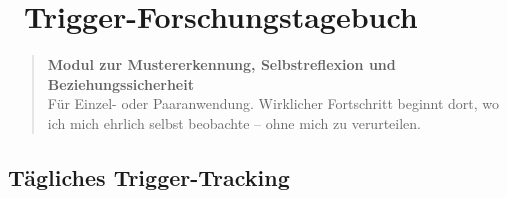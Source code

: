 
\section*{\textcolor{ctmmBlue}{\faSearch~Trigger-Forschungstagebuch}}
\label{sec:trigger-forschungstagebuch}

\begin{quote}
\textbf{\textcolor{ctmmBlue}{Modul zur Mustererkennung, Selbstreflexion und Beziehungssicherheit}}\\
Für Einzel- oder Paaranwendung. Wirklicher Fortschritt beginnt dort, wo ich mich ehrlich selbst beobachte -- ohne mich zu verurteilen.
\end{quote}

\subsection*{\textcolor{ctmmBlue}{Tägliches Trigger-Tracking}}

